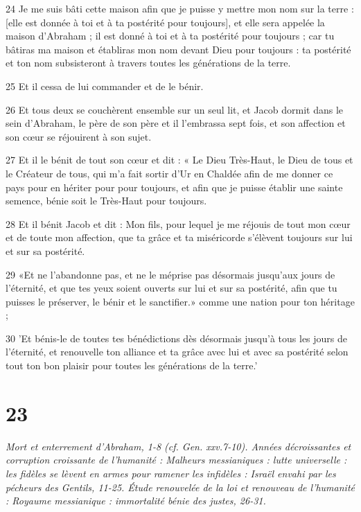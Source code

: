 \par    
\par 24 Je me suis bâti cette maison afin que je puisse y mettre mon nom sur la terre : [elle est donnée à toi et à ta postérité pour toujours], et elle sera appelée la maison d'Abraham ; il est donné à toi et à ta postérité pour toujours ; car tu bâtiras ma maison et établiras mon nom devant Dieu pour toujours : ta postérité et ton nom subsisteront à travers toutes les générations de la terre.
\par    
\par 25 Et il cessa de lui commander et de le bénir.
\par 26 Et tous deux se couchèrent ensemble sur un seul lit, et Jacob dormit dans le sein d'Abraham, le père de son père et il l'embrassa sept fois, et son affection et son cœur se réjouirent à son sujet.
\par 27 Et il le bénit de tout son cœur et dit : « Le Dieu Très-Haut, le Dieu de tous et le Créateur de tous, qui m'a fait sortir d'Ur en Chaldée afin de me donner ce pays pour en hériter pour pour toujours, et afin que je puisse établir une sainte semence, bénie soit le Très-Haut pour toujours.
\par 28 Et il bénit Jacob et dit : Mon fils, pour lequel je me réjouis de tout mon cœur et de toute mon affection, que ta grâce et ta miséricorde s'élèvent toujours sur lui et sur sa postérité.
\par 29 «Et ne l'abandonne pas, et ne le méprise pas désormais jusqu'aux jours de l'éternité, et que tes yeux soient ouverts sur lui et sur sa postérité, afin que tu puisses le préserver, le bénir et le sanctifier.» comme une nation pour ton héritage ;
\par 30 'Et bénis-le de toutes tes bénédictions dès désormais jusqu'à tous les jours de l'éternité, et renouvelle ton alliance et ta grâce avec lui et avec sa postérité selon tout ton bon plaisir pour toutes les générations de la terre.'

\chapter{23}

\par \textit{Mort et enterrement d'Abraham, 1-8 (cf. Gen. xxv.7-10). Années décroissantes et corruption croissante de l'humanité : Malheurs messianiques : lutte universelle : les fidèles se lèvent en armes pour ramener les infidèles : Israël envahi par les pécheurs des Gentils, 11-25. Étude renouvelée de la loi et renouveau de l'humanité : Royaume messianique : immortalité bénie des justes, 26-31.}

